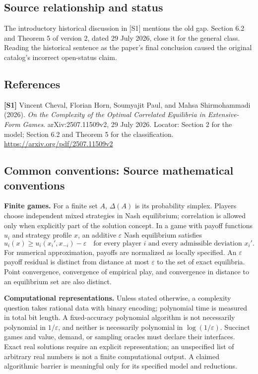 \documentclass[11pt,a4paper]{article}
\begin{document}
\subsection*{Source relationship and status}
The introductory historical discussion in [S1] mentions the old gap. Section 6.2 and Theorem 5 of version 2, dated 29 July 2026, close it for the general class. Reading the historical sentence as the paper's final conclusion caused the original catalog's incorrect open-status claim.
\subsection*{References}
\begingroup\footnotesize\raggedright
{\footnotesize\raggedright
\textbf{[S1]} Vincent Cheval, Florian Horn, Soumyajit Paul, and Mahsa Shirmohammadi (2026). \emph{On the Complexity of the Optimal Correlated Equilibria in Extensive-Form Games}. arXiv:2507.11509v2, 29 July 2026. Locator: Section 2 for the model; Section 6.2 and Theorem 5 for the classification. \url{https://arxiv.org/pdf/2507.11509v2}\par}
\par\endgroup

\subsection*{Common conventions: Source mathematical conventions}

\textbf{Finite games.} For a finite set $A$, $\Delta(A)$ is its probability
simplex. Players choose independent mixed strategies in Nash equilibrium;
correlation is allowed only when explicitly part of the solution concept.
In a game with payoff functions $u_i$ and strategy profile $x$, an additive
$\varepsilon$ Nash equilibrium satisfies
\[
 u_i(x)\geq u_i(x_i',x_{-i})-\varepsilon
 \quad\text{for every player $i$ and every admissible deviation $x_i'$}.
\]
For numerical approximation, payoffs are normalized as locally specified.
An $\varepsilon$ payoff residual is distinct from distance at most
$\varepsilon$ to the set of exact equilibria. Point convergence, convergence
of empirical play, and convergence in distance to an equilibrium set are
also distinct.

\textbf{Computational representations.} Unless stated otherwise, a complexity
question takes rational data with binary encoding; polynomial time is measured
in total bit length. A fixed-accuracy polynomial algorithm is not necessarily
polynomial in $1/\varepsilon$, and neither is necessarily polynomial in
$\log(1/\varepsilon)$. Succinct games and value, demand, or sampling oracles
must declare their interfaces. Exact real solutions require an explicit
representation; an unspecified list of arbitrary real numbers is not a
finite computational output. A claimed algorithmic barrier is meaningful
only for its specified model and reductions.
\end{document}
